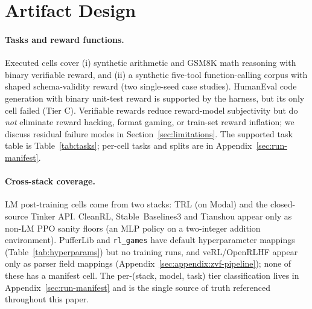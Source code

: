 \documentclass{article}
\begin{document}
\section{Artifact Design}
\label{sec:benchmark}

\paragraph{Tasks and reward functions.}
Executed cells cover (i) synthetic arithmetic and GSM8K math reasoning with
binary verifiable reward, and (ii) a synthetic five-tool function-calling
corpus with shaped schema-validity reward (two single-seed case studies).
HumanEval code generation with binary unit-test reward is supported by the
harness, but its only cell failed (Tier C). Verifiable
rewards reduce reward-model subjectivity but do \emph{not} eliminate
reward hacking, format gaming, or train-set reward inflation; we discuss
residual failure modes in Section~\ref{sec:limitations}. The supported task
table is Table~\ref{tab:tasks}; per-cell tasks and splits are in
Appendix~\ref{sec:run-manifest}.

\paragraph{Cross-stack coverage.}
LM post-training cells come from two stacks: TRL (on Modal) and the
closed-source Tinker API. CleanRL, Stable~Baselines3 and Tianshou appear only
as non-LM PPO sanity floors (an MLP policy on a two-integer addition
environment). PufferLib and \texttt{rl\_games} have default hyperparameter
mappings (Table~\ref{tab:hyperparams}) but no training runs, and veRL/OpenRLHF
appear only as parser field mappings (Appendix~\ref{sec:appendix:zvf-pipeline});
none of these has a manifest cell. The per-(stack, model, task)
tier classification lives in Appendix~\ref{sec:run-manifest} and is the
single source of truth referenced throughout this paper.
\end{document}
